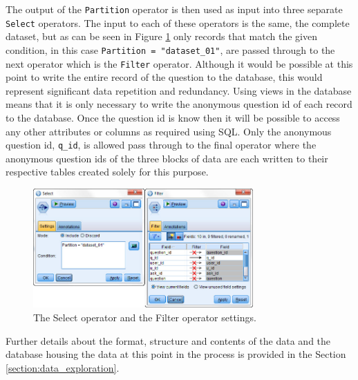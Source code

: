 The output of the \verb|Partition| operator is then used as input into three separate \verb|Select| operators. The input to each of these operators is the same, the complete dataset, but as can be seen in Figure \ref{fig:chapter4:select_filter} only records that match the given condition, in this case \verb|Partition = "dataset_01"|, are passed through to the next operator which is the \verb|Filter| operator. Although it would be possible at this point to write the entire record of the question to the database, this would represent significant data repetition and redundancy. Using views in the database means that it is only necessary to write the anonymous question id of each record to the database. Once the question id is know then it will be possible to access any other attributes or columns as required using SQL. Only the anonymous question id, \verb|q_id|, is allowed pass through to the final operator where the anonymous question ids of the three blocks of data are each written to their respective tables created solely for this purpose.

\begin{figure}[htbp]
	\centering
	\includegraphics[width=0.75\textwidth]{Figures/Chapter4/select_filter.jpg}
	\caption[Select operator and the Filter operator settings]{The Select operator and the Filter operator settings.}
	\label{fig:chapter4:select_filter}
\end{figure}

Further details about the format, structure and contents of the data and the database housing the data at this point in the process is provided in the Section \ref{section:data_exploration}.

